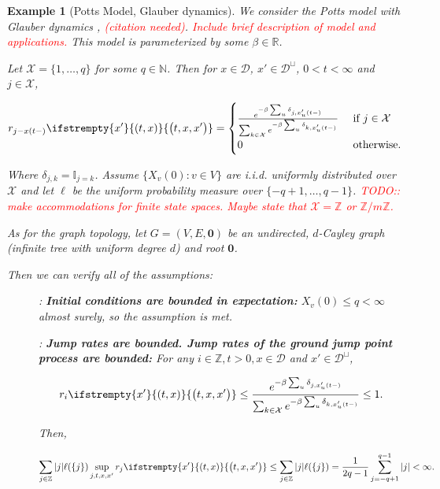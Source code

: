 \documentclass[12pt]{article}
\newcommand{\mb}{\mathbb}
\newcommand{\mc}{\mathcal}
\newcommand{\te}{\text}
\newcommand{\tr}{\textcolor{red}}
\newcommand{\ind}{\hspace{24pt}}
\newcommand{\cad}{\mc{D}}							%
\newcommand{\sta}{\mc{X}}							%
\renewcommand{\root}{\mathbf{0}}					%
\newcommand{\Xf}{X}									%
\newcommand{\Sm}{\ell}								%
\newcommand{\rate}{r}								%
\newcommand{\xf}{x}									%
\newcommand{\vind}[1]{_{#1}}						%
\newcommand{\tme}[1]{(#1)}							%
\newcommand{\stpara}[1]{_{#1}}						%
\newcommand{\tmepro}[3]{
\ifstrempty{#3}{
	\left(#1,#2\right)}{
	\left(#1,#2,#3\right)}}							%
\newtheorem{example}[thms]{Example}
\begin{document}
\begin{example}[Potts Model, Glauber dynamics]
\label{ex::Potts}
We consider the Potts model with Glauber dynamics \cite{Gla63}, \tr{(citation needed)}. \tr{Include brief description of model and applications.} This model is parameterized by some \(\beta\in\mb{R}\).

\ind Let \(\sta = \{1,\dots,q\}\) for some \(q \in \mb{N}\). Then for \(\xf \in \cad\), \(\xf' \in \cad^\sqcup\), \(0 < t < \infty\) and \(j \in \sta\), 

\[\rate\stpara{j-\xf\tme{t-}}\tmepro{t}{\xf}{\xf'} = \begin{cases}
\frac{e^{-\beta\sum_{u} \delta_{j,\xf'_u\tme{t-}}}}{\sum_{k \in \sta} e^{-\beta\sum_{u} \delta_{k,\xf'_u\tme{t-}}}} &\te{ if } j \in \sta\\
0 &\te{ otherwise.}
\end{cases}\]

Where \(\delta_{j,k} = \mb{I}_{j=k}\). Assume \(\{\Xf\vind{v}\tme{0}: v \in V\}\) are i.i.d. uniformly distributed over \(\sta\) and let \(\Sm\) be the uniform probability measure over \(\{-q+1,\dots,q-1\}\). \tr{TODO:: make accommodations for finite state spaces. Maybe state that \(\sta = \mathbb{Z}\) or \(\mathbb{Z}/m\mathbb{Z}\).}

\ind As for the graph topology, let \(G = (V,E, \root)\) be an undirected, \(d\)-Cayley graph (infinite tree with uniform degree \(d\)) and root \(\root\).

Then we can verify all of the assumptions:

\begin{description}
\item[] \cite[Assumption \ref{F-a::bddinit}]{F}: \textbf{Initial conditions are bounded in expectation:} \(\Xf\vind{v}\tme{0} \leq q < \infty\) almost surely, so the assumption is met.

\item[] \cite[Assumption \ref{F-a::bddr}]{F}: \textbf{Jump rates are bounded. Jump rates of the ground jump point process are bounded:} For any \(i\in \mb{Z},t >0, \xf \in \cad\) and \(\xf'\in\cad^\sqcup\),

\[\rate\stpara{i}\tmepro{t}{\xf}{\xf'} \leq \frac{e^{-\beta\sum_{u} \delta_{j,\xf'_u\tme{t-}}}}{\sum_{k \in \sta} e^{-\beta\sum_{u} \delta_{k,\xf'_u\tme{t-}}}} \leq 1.\]

Then, 

\[\sum_{j \in \mb{Z}}|j|\Sm(\{j\})\sup_{j,t,x,x'} \rate\stpara{j}\tmepro{t}{\xf}{\xf'} \leq \sum_{j \in \mb{Z}}|j|\Sm(\{j\}) = \frac{1}{2q-1}\sum_{j = -q+1}^{q-1} |j| < \infty.\]


\end{description}
\end{example}
\end{document}
